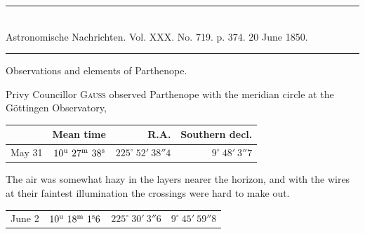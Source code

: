 \clearpage
\hypertarget{native-483-parthenope}{}
\begin{center}
\rule{0.55\linewidth}{0.4pt}\\[2pt]
Astronomische Nachrichten. Vol. XXX. No. 719. p. 374. 20 June 1850.\\[2pt]
\rule{0.55\linewidth}{0.4pt}
\end{center}
\begin{center}Observations and elements of Parthenope.\end{center}

Privy Councillor \textsc{Gauss} observed Parthenope with the meridian circle at the Göttingen Observatory,

\begin{center}
\setlength{\tabcolsep}{4pt}
\begin{tabular}{l|r|r|r}
 & Mean time & R.A. & Southern decl. \\\hline
May 31 & $10^{\rm u}\ 27^{\rm m}\ 38^{\rm s}$ & $225^\circ\ 52'\ 38''4$ & $9^\circ\ 48'\ 3''7$ \\
\end{tabular}
\end{center}

The air was somewhat hazy in the layers nearer the horizon, and with the wires at their faintest illumination the crossings were hard to make out.

\begin{center}
\setlength{\tabcolsep}{4pt}
\begin{tabular}{l|r|r|r}
June 2 & $10^{\rm u}\ 18^{\rm m}\ 1^{\rm s}6$ & $225^\circ\ 30'\ 3''6$ & $9^\circ\ 45'\ 59''8$ \\
\end{tabular}
\end{center}


